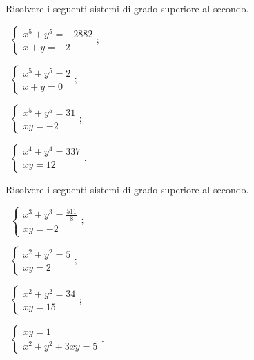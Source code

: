 \begin{esercizio}[\Ast]
 \label{ese:6.31}
Risolvere i seguenti sistemi di grado superiore al secondo.
\begin{multicols}{2}
 \begin{enumeratea}
 \item~$\left\{\begin{array}{l}x^5+y^5=-2882\\x+y=-2\end{array}\right.$;
 \item~$\left\{\begin{array}{l}x^5+y^5=2\\x+y=0\end{array}\right.$;
 \item~$\left\{\begin{array}{l}x^5+y^5=31\\xy=-2\end{array}\right.$;
 \item~$\left\{\begin{array}{l}x^4+y^4=337\\xy=12\end{array}\right.$.
 \end{enumeratea}
 \end{multicols}
\end{esercizio}
\newpage
\begin{esercizio}[\Ast]
 \label{ese:6.32}
Risolvere i seguenti sistemi di grado superiore al secondo.
\begin{multicols}{2}
 \begin{enumeratea}
 \item~$\left\{\begin{array}{l}x^3+y^3=\frac{511} 8\\xy=-2\end{array}\right.$;
 \item~$\left\{\begin{array}{l}x^2+y^2=5\\xy=2 \end{array}\right.$;
 \item~$\left\{\begin{array}{l}x^2+y^2=34\\xy=15 \end{array}\right.$;
 \item~$\left\{\begin{array}{l}xy=1 \\x^2+y^2+3xy=5\end{array}\right.$.
 \end{enumeratea}
 \end{multicols}
\end{esercizio}

